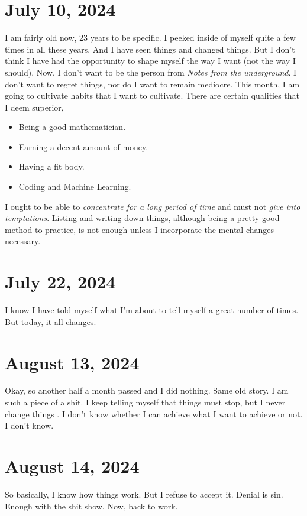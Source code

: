 \section{July 10, 2024}
\noindent I am fairly old now, 23 years to be specific. I peeked inside of myself quite a few times in all
these years. And I have seen things and changed things. But I don't think I have had the opportunity to
shape myself the way I want (not the way I should). Now, I don't want to be the person from \emph{Notes
from the underground}. I don't want to regret things, nor do I want to remain mediocre. This month, I am
going to cultivate habits that I want to cultivate. There are certain qualities that I deem superior,

\begin{itemize}
\itemsep0em
	\item Being a good mathematician.
	\item Earning a decent amount of money.
	\item Having a fit body.
	\item Coding and Machine Learning.
\end{itemize}

\noindent I ought to be able to \emph{concentrate for a long period of time} and must not \emph{give into
temptations}. Listing and writing down things, although being a pretty good method to practice, is not 
enough unless I incorporate the mental changes necessary.

\section{July 22, 2024}
\noindent I know I have told myself what I'm about to tell myself a great number of times. But today, it all
changes.

\section{August 13, 2024}
\noindent Okay, so another half a month passed and I did nothing. Same old story. I am such a piece of a shit.
I keep telling myself that things must stop, but I never change things . I don't know whether I can
achieve what I want to achieve or not. I don't know.

\section{August 14, 2024}
\noindent So basically, I know how things work. But I refuse to accept it. Denial is sin. Enough with the shit
show. Now, back to work.


